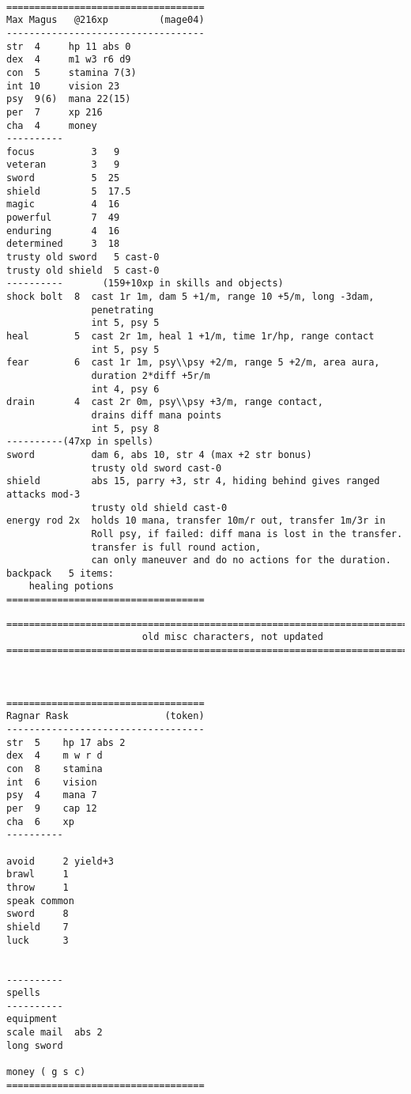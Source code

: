 \


\goodbreak
\tiny \begin{samepage} \begin{verbatim}
===================================
Max Magus   @216xp         (mage04)
-----------------------------------
str  4     hp 11 abs 0
dex  4     m1 w3 r6 d9
con  5     stamina 7(3)
int 10     vision 23
psy  9(6)  mana 22(15)
per  7     xp 216
cha  4     money
----------
focus          3   9
veteran        3   9
sword          5  25
shield         5  17.5
magic          4  16
powerful       7  49
enduring       4  16
determined     3  18
trusty old sword   5 cast-0
trusty old shield  5 cast-0
----------       (159+10xp in skills and objects)
shock bolt  8  cast 1r 1m, dam 5 +1/m, range 10 +5/m, long -3dam,
               penetrating
               int 5, psy 5
heal        5  cast 2r 1m, heal 1 +1/m, time 1r/hp, range contact
               int 5, psy 5
fear        6  cast 1r 1m, psy\\psy +2/m, range 5 +2/m, area aura,
               duration 2*diff +5r/m
               int 4, psy 6
drain       4  cast 2r 0m, psy\\psy +3/m, range contact,
               drains diff mana points
               int 5, psy 8
----------(47xp in spells)
sword          dam 6, abs 10, str 4 (max +2 str bonus)
               trusty old sword cast-0
shield         abs 15, parry +3, str 4, hiding behind gives ranged attacks mod-3
               trusty old shield cast-0
energy rod 2x  holds 10 mana, transfer 10m/r out, transfer 1m/3r in
               Roll psy, if failed: diff mana is lost in the transfer.
               transfer is full round action,
               can only maneuver and do no actions for the duration.
backpack   5 items:
    healing potions
===================================
\end{verbatim} \end{samepage} \normalsize









\clearpage

\goodbreak
\tiny \begin{samepage} \begin{verbatim}
================================================================================
                        old misc characters, not updated
================================================================================



===================================
Ragnar Rask                 (token)
-----------------------------------
str  5    hp 17 abs 2
dex  4    m w r d
con  8    stamina
int  6    vision
psy  4    mana 7
per  9    cap 12
cha  6    xp
----------

avoid     2 yield+3
brawl     1
throw     1
speak common
sword     8
shield    7
luck      3


----------
spells
----------
equipment
scale mail  abs 2
long sword

money ( g s c)
===================================
\end{verbatim} \end{samepage} \normalsize


